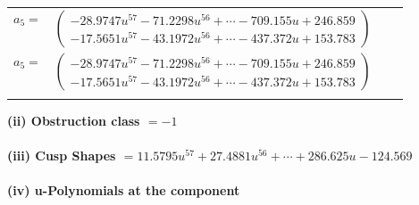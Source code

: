 \documentclass[1p]{elsarticle_modified}
\theoremstyle{definition}
\begin{document}
\begin{tabular}{m{7pt} m{180pt} m{7pt} m{180pt} }
\flushright $a_{5}=$&$\begin{pmatrix}-28.9747 u^{57}-71.2298 u^{56}+\cdots-709.155 u+246.859\\-17.5651 u^{57}-43.1972 u^{56}+\cdots-437.372 u+153.783\end{pmatrix}$\\ \flushright $a_{5}=$&$\begin{pmatrix}-28.9747 u^{57}-71.2298 u^{56}+\cdots-709.155 u+246.859\\-17.5651 u^{57}-43.1972 u^{56}+\cdots-437.372 u+153.783\end{pmatrix}$\\&\end{tabular}
\flushleft \textbf{(ii) Obstruction class $= -1$}\\~\\
\flushleft \textbf{(iii) Cusp Shapes $= 11.5795 u^{57}+27.4881 u^{56}+\cdots+286.625 u-124.569$}\\~\\
\newpage\renewcommand{\arraystretch}{1}
\flushleft \textbf{(iv) u-Polynomials at the component}\newline \\
\end{document}
